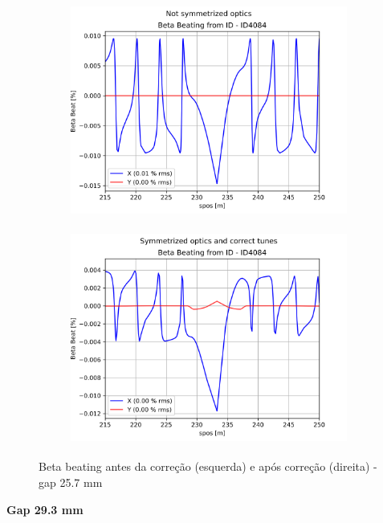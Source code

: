 \documentclass[a4paper,12pt]{article}
\begin{document}
\begin{figure}[H]
\begin{subfigure}{0.5\textwidth}
\includegraphics[width=0.9\linewidth, height=7cm]{figs/phase0 gap25 uncorrected-optics.png} 
\label{fig:subim1025}
\end{subfigure}
\begin{subfigure}{0.5\textwidth}
\includegraphics[width=0.9\linewidth, height=7cm]{figs/phase0 gap25 corrected-optics-tunes.png}
\label{fig:subim2025}
\end{subfigure}
\caption{Beta beating antes da correção (esquerda) e após correção (direita) - gap 25.7 mm}
\label{fig:bb0_25}
\end{figure}

\textbf{Gap 29.3 mm} \\
\end{document}
